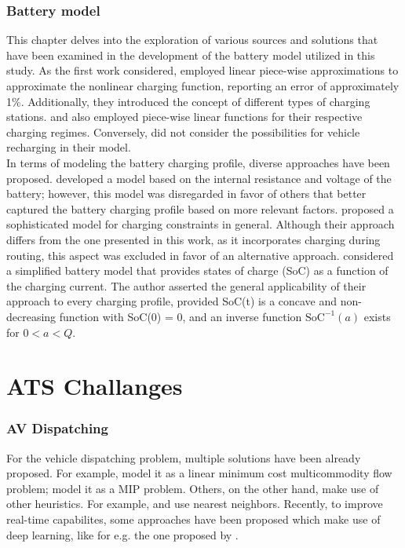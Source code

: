 \subsubsection*{Battery model}
This chapter delves into the exploration of various sources and solutions that have been examined in the development of the battery model utilized in this study. As the first work considered,  employed linear piece-wise approximations to approximate the nonlinear charging function, reporting an error of approximately 1\%. Additionally, they introduced the concept of different types of charging stations.  and  also employed piece-wise linear functions for their respective charging regimes. Conversely,  did not consider the possibilities for vehicle recharging in their model.\\
In terms of modeling the battery charging profile, diverse approaches have been proposed.  developed a model based on the internal resistance and voltage of the battery; however, this model was disregarded in favor of others that better captured the battery charging profile based on more relevant factors.  proposed a sophisticated model for charging constraints in general. Although their approach differs from the one presented in this work, as it incorporates charging during routing, this aspect was excluded in favor of an alternative approach.  considered a simplified battery model that provides states of charge (SoC) as a function of the charging current. The author asserted the general applicability of their approach to every charging profile, provided SoC(t) is a concave and non-decreasing function with SoC(0) = 0, and an inverse function $\text{SoC}^{-1}(a)$ exists for $0 < a < Q$.\\
\section{ATS Challanges}

\subsubsection*{AV Dispatching}
For the vehicle dispatching problem, multiple solutions have been already proposed. For example,  model it as a linear minimum cost multicommodity flow problem;  model it as a MIP problem. Others, on the other hand, make use of other heuristics. For example,  and  use nearest neighbors. Recently, to improve real-time capabilites, some approaches have been proposed which make use of deep learning, like for e.g. the one proposed by .\\

